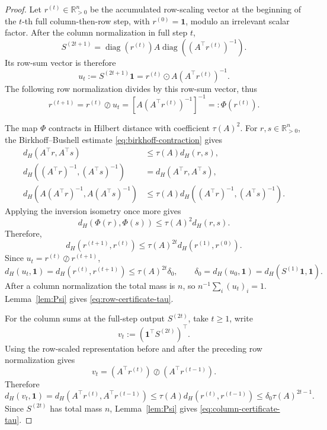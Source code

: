 \documentclass[10pt]{article}
\numberwithin{equation}{section}
\theoremstyle{plain}
\theoremstyle{definition}
\theoremstyle{remark}
\newcommand{\R}{\mathbb{R}}
\newcommand{\ones}{\mathbf{1}}
\newcommand{\diag}{\operatorname{diag}}
\begin{document}
\begin{proof}
Let \(r^{(t)}\in\R_{>0}^n\) be the accumulated row-scaling vector at the
beginning of the \(t\)-th full column-then-row step, with
\(r^{(0)}=\ones\), modulo an irrelevant scalar factor.  After the column
normalization in full step \(t\),
\[
S^{(2t+1)}
=
\diag(r^{(t)})A\diag\!\left((A^\top r^{(t)})^{-1}\right).
\]
Its row-sum vector is therefore
\[
u_t
:=
S^{(2t+1)}\ones
=
r^{(t)}\odot A(A^\top r^{(t)})^{-1}.
\]
The following row normalization divides by this row-sum vector, thus
\[
r^{(t+1)}
=
r^{(t)}\oslash u_t
=
\left[A(A^\top r^{(t)})^{-1}\right]^{-1}
=:\Phi(r^{(t)}).
\]

The map \(\Phi\) contracts in Hilbert distance with coefficient
\(\tau(A)^2\).  For \(r,s\in\R_{>0}^n\), the Birkhoff--Bushell estimate \eqref{eq:birkhoff-contraction} gives
\begin{align*}
d_H(A^\top r,A^\top s)
&\le \tau(A)d_H(r,s),\\
d_H((A^\top r)^{-1},(A^\top s)^{-1})
&=d_H(A^\top r,A^\top s),\\
d_H(A(A^\top r)^{-1},A(A^\top s)^{-1})
&\le \tau(A)d_H((A^\top r)^{-1},(A^\top s)^{-1}).
\end{align*}
Applying the inversion isometry once more gives
\[
d_H(\Phi(r),\Phi(s))\le \tau(A)^2d_H(r,s).
\]
Therefore,
\[
d_H(r^{(t+1)},r^{(t)})
\le
\tau(A)^{2t}d_H(r^{(1)},r^{(0)}).
\]
Since \(u_t=r^{(t)}\oslash r^{(t+1)}\),
\[
d_H(u_t,\ones)
=
d_H(r^{(t)},r^{(t+1)})
\le
\tau(A)^{2t}\delta_0,
\qquad
\delta_0=d_H(u_0,\ones)=d_H(S^{(1)}\ones,\ones).
\]
After a column normalization the total mass is \(n\), so
\(n^{-1}\sum_i (u_t)_i=1\).  Lemma~\ref{lem:Psi} gives
\eqref{eq:row-certificate-tau}.

For the column sums at the full-step output \(S^{(2t)}\), take
\(t\ge1\), write
\[
v_t:=(\ones^\top S^{(2t)})^\top .
\]
Using the row-scaled representation before and after the preceding row
normalization gives
\[
v_t
=
(A^\top r^{(t)})\oslash(A^\top r^{(t-1)}).
\]
Therefore
\[
d_H(v_t,\ones)
=
d_H(A^\top r^{(t)},A^\top r^{(t-1)})
\le
\tau(A)d_H(r^{(t)},r^{(t-1)})
\le
\delta_0\tau(A)^{2t-1}.
\]
Since \(S^{(2t)}\) has total mass \(n\), Lemma~\ref{lem:Psi} gives
\eqref{eq:column-certificate-tau}.
\end{proof}
\end{document}
